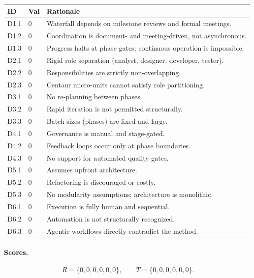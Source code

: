\documentclass[11pt, a4paper, twocolumn]{article} %
\begin{document}
\begin{table}[h]
\centering
\begin{tabular}{llp{10.5cm}}
\toprule
\textbf{ID} & \textbf{Val} & \textbf{Rationale} \\
\midrule
D1.1 & 0 & Waterfall depends on milestone reviews and formal meetings. \\
D1.2 & 0 & Coordination is document- and meeting-driven, not asynchronous. \\
D1.3 & 0 & Progress halts at phase gates; continuous operation is impossible. \\
\midrule
D2.1 & 0 & Rigid role separation (analyst, designer, developer, tester). \\
D2.2 & 0 & Responsibilities are strictly non-overlapping. \\
D2.3 & 0 & Centaur micro-units cannot satisfy role partitioning. \\
\midrule
D3.1 & 0 & No re-planning between phases. \\
D3.2 & 0 & Rapid iteration is not permitted structurally. \\
D3.3 & 0 & Batch sizes (phases) are fixed and large. \\
\midrule
D4.1 & 0 & Governance is manual and stage-gated. \\
D4.2 & 0 & Feedback loops occur only at phase boundaries. \\
D4.3 & 0 & No support for automated quality gates. \\
\midrule
D5.1 & 0 & Assumes upfront architecture. \\
D5.2 & 0 & Refactoring is discouraged or costly. \\
D5.3 & 0 & No modularity assumptions; architecture is monolithic. \\
\midrule
D6.1 & 0 & Execution is fully human and sequential. \\
D6.2 & 0 & Automation is not structurally recognized. \\
D6.3 & 0 & Agentic workflows directly contradict the method. \\
\bottomrule
\end{tabular}
\end{table}

\paragraph{Scores.}

\[
R = \{0, 0, 0, 0, 0, 0\},\qquad
T = \{0, 0, 0, 0, 0, 0\}.
\]
\end{document}
